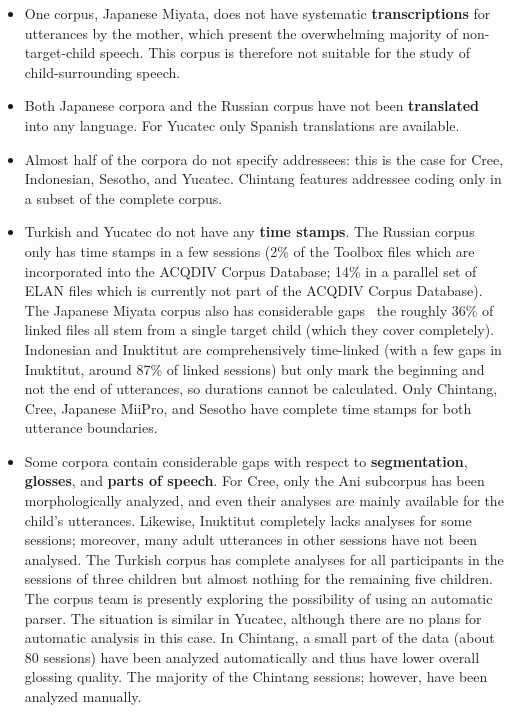 \documentclass[a4paper, 11pt]{book}
\begin{document}
\begin{itemize}
	\item One corpus, Japanese Miyata, does not have systematic \textbf{transcriptions} for utterances by the mother, which present the overwhelming
		majority of non-target-child speech. This corpus is therefore not suitable for the study of child-surrounding speech. 
	\item Both Japanese corpora and the Russian corpus have not been \textbf{translated} into any language. For Yucatec only Spanish translations are available. 
	\item Almost half of the corpora do not specify addressees: this is the case for Cree, Indonesian, Sesotho, and Yucatec. Chintang features addressee coding
		only in a subset of the complete corpus. 
	\item Turkish and Yucatec do not have any \textbf{time stamps}. The Russian corpus only has time stamps in a few sessions (2\% of the Toolbox files which are incorporated
		into the ACQDIV Corpus Database; 14\% in a parallel set of ELAN files which is currently not part of the ACQDIV Corpus Database). The Japanese Miyata corpus also has considerable gaps
		\textendash\ the roughly 36\% of linked files all stem from a single target child (which they cover completely). Indonesian and Inuktitut 
		are comprehensively time-linked (with a few gaps in Inuktitut, around 87\% of linked sessions) but only mark the beginning and not the 
		end of utterances, so durations cannot be calculated. Only Chintang, Cree, Japanese MiiPro, and Sesotho have complete time stamps 
		for both utterance boundaries. 
	\item Some corpora contain considerable gaps with respect to \textbf{segmentation}, \textbf{glosses}, and \textbf{parts of speech}. For Cree, only the Ani subcorpus has been morphologically analyzed, and even their analyses are mainly available for the child’s utterances. Likewise, Inuktitut completely lacks analyses for some sessions; moreover, many adult utterances in other sessions have not been analysed. The Turkish corpus has complete analyses for all participants in the sessions of three children but almost nothing for the remaining five children. The corpus team is presently exploring the possibility of using an automatic parser. The situation is similar in Yucatec, although there are no plans for automatic analysis in this case. In Chintang, a small part of the data (about 80 sessions) have been analyzed automatically and thus have lower overall glossing quality. The majority of the Chintang sessions; however, have been analyzed manually.

\end{itemize}
\end{document}
